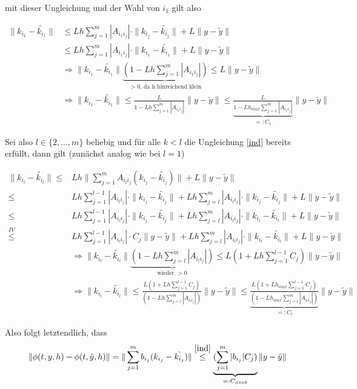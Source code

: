 \begin{solution}
mit dieser Ungleichung und der Wahl von $i_{1}$ gilt also

\begin{align*}
  \|k_{i_{1}}-\tilde{k_{i_{1}}}\| &\leq Lh \sum_{j=1}^{m}|A_{i_{1}i_{j}}|\cdot\|k_{i_{j}}-\tilde{k_{i_{j}}}\| + L\|y-\tilde{y}\| \\
  &\leq Lh\sum_{j=1}^{m}|A_{i_{1}i_{j}}| \cdot \|k_{i_{1}}-\tilde{k_{i_{1}}}\| + L\|y-\tilde{y}\| \\
  &\Rightarrow  \|k_{i_{1}}-\tilde{k_{i_{1}}}\| \underbrace{(1-Lh\sum_{j=1}^{m}|A_{i_{1}i_{j}}|)}_{>0 \text{,~da h hinreichend klein}} \leq L\|y-\tilde{y}\| \\
  &\Rightarrow  \|k_{i_{1}}-\tilde{k_{i_{1}}}\|  \leq \frac{L}{1-Lh\sum_{j=1}^{m}|A_{i_{1}i_{j}}|}\|y-\tilde{y}\| \leq  \underbrace{\frac{L}{1-Lh_{max}\sum_{j=1}^{m}|A_{i_{1}i_{j}}|}}_{=:C_{1}} \|y-\tilde{y}\|
\end{align*}

Sei also $l \in \{2,...,m\}$ beliebig und für alle $k<l$ die Ungleichung \eqref{ind} bereits erfüllt, dann gilt (zunächst analog wie bei $l=1$)

\begin{align*}
  \|k_{i_{l}}-\tilde{k_{i_{l}}}\| \leq& Lh \|\sum_{j=1}^{m}A_{i_{l}i_{j}}(k_{i_{j}}-\tilde{k_{i_{j}}})\| + L\|y-\tilde{y}\| \\
  \leq& Lh\sum_{j=1}^{l-1}|A_{i_{l}i_{j}}|\cdot\|k_{i_{j}}-\tilde{k_{i_{j}}}\| + Lh\sum_{j=l}^{m}|A_{i_{l}i_{j}}|\cdot\|k_{i_{j}}-\tilde{k_{i_{j}}}\| + L\|y-\tilde{y}\| \\
  \stackrel{}{\leq}& Lh\sum_{j=1}^{l-1}|A_{i_{l}i_{j}}|\cdot\|k_{i_{j}}-\tilde{k_{i_{j}}}\| + Lh\sum_{j=l}^{m}|A_{i_{l}i_{j}}| \cdot \|k_{i_{l}}-\tilde{k_{i_{l}}}\|+ L\|y-\tilde{y}\| \\
  \stackrel{IV}{\leq}& Lh\sum_{j=1}^{l-1}|A_{i_{l}i_{j}}|\cdot C_{j} \|y-\tilde{y}\| + Lh\sum_{j=l}^{m}|A_{i_{l}i_{j}}| \cdot \|k_{i_{l}}-\tilde{k_{i_{l}}}\|+ L\|y-\tilde{y}\| \\
  &\Rightarrow  \|k_{i_{l}}-\tilde{k_{i_{l}}}\| \underbrace{(1-Lh\sum_{j=l}^{m}|A_{i_{l}i_{j}}|)}_{\text{wieder~} >0} \leq L(1+Lh\sum_{j=1}^{l-1}C_{j}) \|y-\tilde{y}\| \\
  &\Rightarrow  \|k_{i_{l}}-\tilde{k_{i_{l}}}\| \leq \frac{L(1+Lh\sum_{j=1}^{l-1}C_{j})}{(1-Lh\sum_{j=l}^{m}|A_{i_{l}i_{j}}|)}\|y-\tilde{y}\| \leq \underbrace{\frac{L(1+Lh_{max}\sum_{j=1}^{l-1}C_{j})}{(1-Lh_{max}\sum_{j=l}^{m}|A_{i_{l}i_{j}}|)}}_{=:C_{l}} \|y-\tilde{y}\|
\end{align*}

Also folgt letztendlich, dass
\begin{align*}
  \|\phi(t,y,h) - \phi(t,\tilde{y},h)\| = \|\sum_{j=1}^{m}b_{i_{j}}(k_{i_{j}}-\tilde{k_{i_{j}}})\| \stackrel{ \eqref{ind}}{\leq} \underbrace{(\sum_{j=1}^{m}|b_{i_{j}}|C_{j})}_{=:C_{Stab}} \|y-\tilde{y}\|
\end{align*}
\end{solution}
